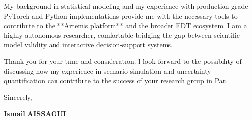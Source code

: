 \documentclass[a4paper,12pt]{article}
\begin{document}
My background in statistical modeling and my experience with production-grade PyTorch and Python implementations provide me with the necessary tools to contribute to the **Artemis platform** and the broader EDT ecosystem. I am a highly autonomous researcher, comfortable bridging the gap between scientific model validity and interactive decision-support systems.

Thank you for your time and consideration. I look forward to the possibility of discussing how my experience in scenario simulation and uncertainty quantification can contribute to the success of your research group in Pau.

Sincerely,

\bigskip

\textbf{Ismail AISSAOUI}
\end{document}
